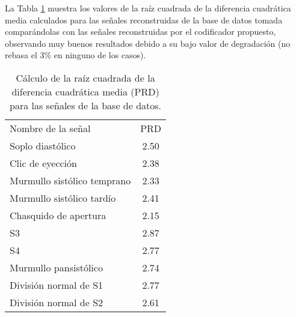La Tabla \ref{PRD} muestra los valores de la raíz cuadrada de la diferencia cuadrática media calculados para las señales reconstruidas de la base de datos tomada comparándolas con las señales reconstruidas por el codificador propuesto, observando muy buenos resultados debido a su bajo valor de degradación (no rebasa el 3\% en ninguno de los casos).
\begin{table}[h]
\centering
\begin{tabular}{l|c}
\hline
\multicolumn{1}{|l|}{\multirow{2}{*}{Nombre de la señal}} & \multicolumn{1}{c|}{\multirow{2}{*}{PRD}} \\
\multicolumn{1}{|l|}{}                                    & \multicolumn{1}{c|}{}                     \\ \hline
Soplo diastólico                                          & 2.50                                     \\ \hline
Clic de eyección                                          & 2.38                                     \\ \hline
Murmullo sistólico temprano                               & 2.33                                     \\ \hline
Murmullo sistólico tardío                                 & 2.41                                     \\ \hline
Chasquido de apertura                                     & 2.15                                     \\ \hline
S3                                                        & 2.87                                     \\ \hline
S4                                                        & 2.77                                     \\ \hline
Murmullo pansistólico                                     & 2.74                                     \\ \hline
División normal de S1                                     & 2.77                                     \\ \hline
División normal de S2                                     & 2.61                                    
\end{tabular}
	\caption{Cálculo de la raíz cuadrada de la diferencia cuadrática media (PRD) para las señales de la base de datos.}
	\label{PRD}
\end{table}



